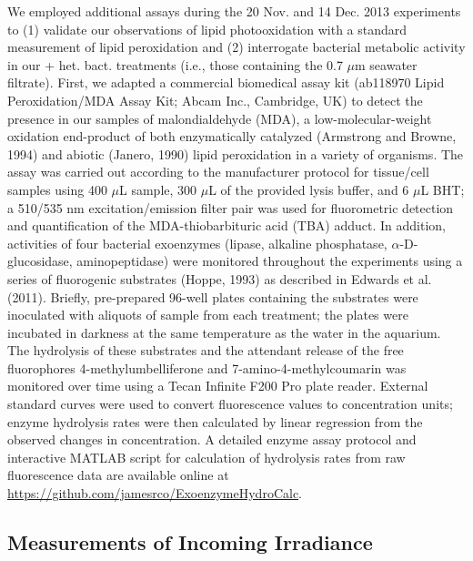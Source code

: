 We employed additional assays during the 20 Nov. and 14 Dec. 2013 experiments to (1) validate our observations of lipid photooxidation with a standard measurement of lipid peroxidation and (2) interrogate bacterial metabolic activity in our + het. bact. treatments (i.e., those containing the 0.7 $\mu$m seawater filtrate). First, we adapted a commercial biomedical assay kit (ab118970 Lipid Peroxidation/MDA Assay Kit; Abcam Inc., Cambridge, UK) to detect the presence in our samples of malondialdehyde (MDA), a low-molecular-weight oxidation end-product of both enzymatically catalyzed (Armstrong and Browne, 1994) and abiotic (Janero, 1990) lipid peroxidation in a variety of organisms. The assay was carried out according to the manufacturer protocol for tissue/cell samples using 400 $\mu$L sample, 300 $\mu$L of the provided lysis buffer, and 6 $\mu$L BHT; a 510/535 nm excitation/emission filter pair was used for fluorometric detection and quantification of the MDA-thiobarbituric acid (TBA) adduct. In addition, activities of four bacterial exoenzymes (lipase, alkaline phosphatase, $\alpha$-D-glucosidase, aminopeptidase) were monitored throughout the experiments using a series of fluorogenic substrates (Hoppe, 1993) as described in Edwards et al. (2011). Briefly, pre-prepared 96-well plates containing the substrates were inoculated with aliquots of sample from each treatment; the plates were incubated in darkness at the same temperature as the water in the aquarium. The hydrolysis of these substrates and the attendant release of the free fluorophores 4-methylumbelliferone and 7-amino-4-methylcoumarin was monitored over time using a Tecan Infinite F200 Pro plate reader. External standard curves were used to convert fluorescence values to concentration units; enzyme hydrolysis rates were then calculated by linear regression from the observed changes in concentration. A detailed enzyme assay protocol and interactive MATLAB script for calculation of hydrolysis rates from raw fluorescence data are available online at \url{https://github.com/jamesrco/ExoenzymeHydroCalc}.

\subsection{Measurements of Incoming Irradiance}
\label{ssec:Measurements of Incoming Irradiance}

